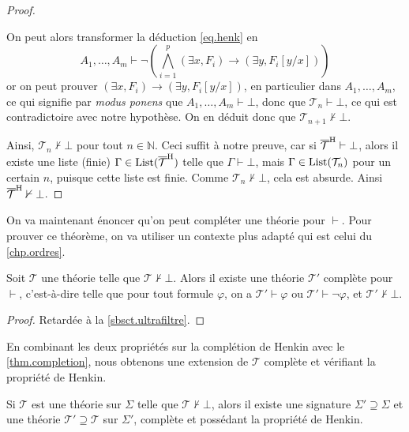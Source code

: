 \begin{proof}
\begin{itemize}
    On peut alors transformer la déduction \ref{eq.henk} en
    \[A_1,\ldots,A_m\vdash \lnot \left(\bigwedge_{i = 1}^p (\exists x, F_i)\to
    (\exists y, F_i[y/x])\right)\]
    or on peut prouver $(\exists x, F_i) \to (\exists y, F_i[y/x])$, en
    particulier dans $A_1,\ldots,A_m$, ce qui signifie par
    \textit{modus ponens} que $A_1,\ldots,A_m\vdash \bot$, donc que
    $\mathcal T_n\vdash \bot$, ce qui est contradictoire avec notre hypothèse.
    On en déduit donc que $\mathcal T_{n+1}\nvdash\bot$.
  \end{itemize}

  Ainsi, $\mathcal T_n\nvdash\bot$ pour tout $n\in \mathbb N$. Ceci suffit à
  notre preuve, car si $\overline{\mathcal T}^{\mathrm H}\vdash \bot$, alors il existe une
  liste (finie) $\Gamma\in\operatorname{List}(\overline{\mathcal T}^{\mathrm H})$ telle que
  $\Gamma\vdash\bot$, mais $\Gamma\in\operatorname{List}(\mathcal T_n)$ pour un certain $n$,
  puisque cette liste est finie. Comme $\mathcal T_n\nvdash\bot$, cela est
  absurde. Ainsi $\overline{\mathcal T}^{\mathrm H}\nvdash\bot$.
\end{proof}

On va maintenant énoncer qu'on peut compléter une théorie pour $\vdash$. Pour
prouver ce théorème, on va utiliser un contexte plus adapté qui est celui du
\cref{chp.ordres}.

\begin{theorem}\label{thm.completion}
  Soit $\mathcal T$ une théorie telle que $\mathcal T \nvdash \bot$. Alors il
  existe une théorie $\mathcal T'$ complète pour $\vdash$, c'est-à-dire telle
  que pour tout formule $\varphi$, on a $\mathcal T'\vdash \varphi$ ou
  $\mathcal T'\vdash \lnot \varphi$, et $\mathcal T'\nvdash\bot$.
\end{theorem}

\begin{proof}
  Retardée à la \cref{sbsct.ultrafiltre}.
\end{proof}

En combinant les deux propriétés sur la complétion de Henkin avec le
\cref{thm.completion}, nous obtenons une extension de $\mathcal T$ complète et
vérifiant la propriété de Henkin.

\begin{lemma}
  Si $\mathcal T$ est une théorie sur $\Sigma$ telle que
  $\mathcal T\nvdash\bot$, alors il existe une signature
  $\Sigma'\supseteq\Sigma$ et une théorie
  $\mathcal T'\supseteq\mathcal T$ sur $\Sigma'$, complète et possédant la
  propriété de Henkin.
\end{lemma}

